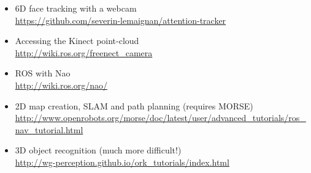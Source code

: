 \documentclass{instructions}
\begin{document}
\begin{itemize}
    \item 6D face tracking with a webcam\\ \url{https://github.com/severin-lemaignan/attention-tracker}
    \item Accessing the Kinect point-cloud\\\url{http://wiki.ros.org/freenect_camera}
    \item ROS with Nao\\\url{http://wiki.ros.org/nao/}
    \item 2D map creation, SLAM and path planning (requires MORSE) \\
        \url{http://www.openrobots.org/morse/doc/latest/user/advanced_tutorials/ros_nav_tutorial.html}
    \item 3D object recognition (much more difficult!)\\\url{http://wg-perception.github.io/ork_tutorials/index.html}
\end{itemize}
\end{document}
